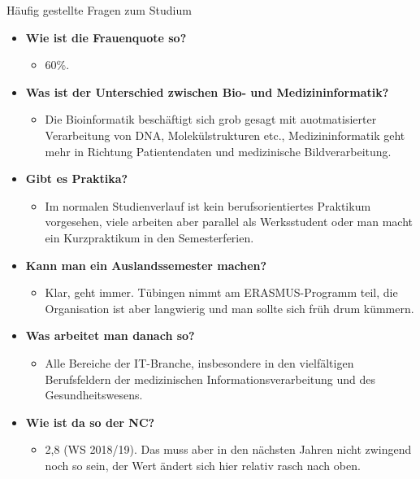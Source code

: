 \begin{block}{Häufig gestellte Fragen zum Studium}
\begin{large}
\begin{itemize}
	\item \textbf{Wie ist die Frauenquote so?}
	\begin{itemize}
		\item 60\%.
	\end{itemize}
\end{itemize}

\begin{itemize}
	\item \textbf{Was ist der Unterschied zwischen Bio- und Medizininformatik?}
	\begin{itemize}
		\item Die Bioinformatik beschäftigt sich grob gesagt mit auotmatisierter Verarbeitung von DNA, Molekülstrukturen etc., Medizininformatik geht mehr in Richtung Patientendaten und medizinische Bildverarbeitung.
	\end{itemize}
\end{itemize}

\begin{itemize}
	\item \textbf{Gibt es Praktika?}
	\begin{itemize}
		\item Im normalen Studienverlauf ist kein berufsorientiertes Praktikum vorgesehen, viele arbeiten aber parallel als Werksstudent oder man macht ein Kurzpraktikum in den Semesterferien.
	\end{itemize}
\end{itemize}

\begin{itemize}
	\item \textbf{Kann man ein Auslandssemester machen?}
	\begin{itemize}
		\item Klar, geht immer. Tübingen nimmt am ERASMUS-Programm teil, die Organisation ist aber langwierig und man sollte sich früh drum kümmern.
	\end{itemize}
\end{itemize}

\begin{itemize}
	\item \textbf{Was arbeitet man danach so?}
	\begin{itemize}
		\item Alle Bereiche der IT-Branche, insbesondere in den vielfältigen Berufsfeldern der medizinischen Informationsverarbeitung und des Gesundheitswesens.
	\end{itemize}
\end{itemize}

\begin{itemize}
	\item \textbf{Wie ist da so der NC?}
	\begin{itemize}
		\item 2,8 (WS 2018/19). Das muss aber in den nächsten Jahren nicht zwingend noch so sein, der Wert ändert sich hier relativ rasch nach oben.
	\end{itemize}
\end{itemize}

\end{large}
\end{block}
